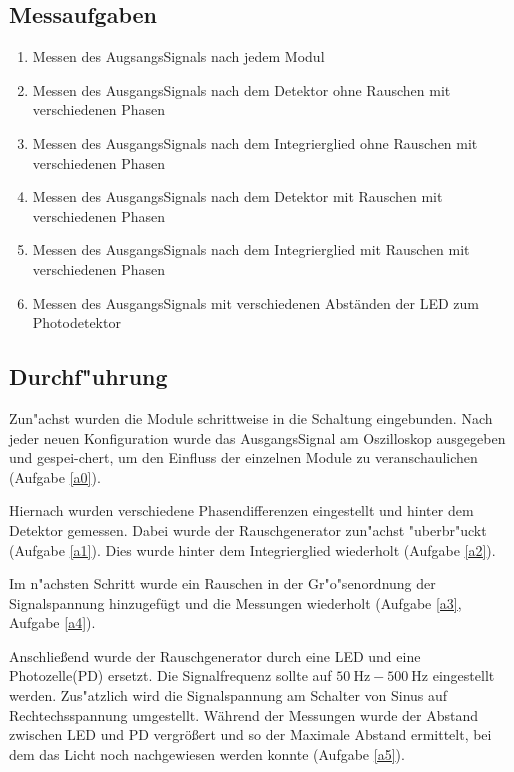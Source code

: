 \documentclass{scrartcl}
\begin{document}
		\subsection{Messaufgaben}

			\begin{enumerate}
				\item \label{a0} Messen des AugsangsSignals nach jedem Modul
				\item \label{a1} Messen des AusgangsSignals nach dem Detektor ohne Rauschen mit verschiedenen Phasen
				\item \label{a2} Messen des AusgangsSignals nach dem Integrierglied ohne Rauschen mit verschiedenen Phasen
				\item \label{a3} Messen des AusgangsSignals nach dem Detektor mit Rauschen mit verschiedenen Phasen
				\item \label{a4} Messen des AusgangsSignals nach dem Integrierglied mit Rauschen mit verschiedenen Phasen
				\item \label{a5} Messen des AusgangsSignals mit verschiedenen Abständen der LED zum Photodetektor
			\end{enumerate}

		\subsection{Durchf"uhrung}

			Zun"achst wurden die Module schrittweise in die Schaltung eingebunden.
			Nach jeder neuen Konfiguration wurde das AusgangsSignal am Oszilloskop ausgegeben und gespei-chert,
			um den Einfluss der einzelnen Module zu veranschaulichen (Aufgabe \ref{a0}).

			Hiernach wurden verschiedene Phasendifferenzen eingestellt und hinter dem Detektor gemessen.
			Dabei wurde der Rauschgenerator zun"achst "uberbr"uckt (Aufgabe \ref{a1}).
			Dies wurde hinter dem Integrierglied wiederholt (Aufgabe \ref{a2}).

			Im n"achsten Schritt wurde ein Rauschen in der Gr"o"senordnung der Signalspannung hinzugefügt und die Messungen
			wiederholt (Aufgabe \ref{a3}, Aufgabe \ref{a4}).

			Anschließend wurde der Rauschgenerator durch eine LED und eine Photozelle(PD) ersetzt.
			Die Signalfrequenz sollte auf $\SI{50}{\hertz}-\SI{500}{\hertz}$ eingestellt werden.
			Zus"atzlich wird die Signalspannung am Schalter von Sinus auf Rechtechsspannung umgestellt.
			Während der Messungen wurde der Abstand zwischen LED und PD vergrößert und so der Maximale Abstand ermittelt,
			bei dem das Licht noch nachgewiesen werden konnte (Aufgabe \ref{a5}).
\end{document}
